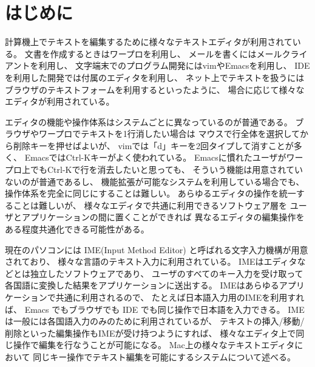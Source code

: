 \section{はじめに}

計算機上でテキストを編集するために様々なテキストエディタが利用されている。
文書を作成するときはワープロを利用し、
メールを書くにはメールクライアントを利用し、
文字端末でのプログラム開発にはvimやEmacsを利用し、
IDEを利用した開発では付属のエディタを利用し、
ネット上でテキストを扱うにはブラウザのテキストフォームを利用するといったように、
場合に応じて様々なエディタが利用されている。

エディタの機能や操作体系はシステムごとに異なっているのが普通である。
ブラウザやワープロでテキストを1行消したい場合は
マウスで行全体を選択してから削除キーを押せばよいが、
vimでは「d」キーを2回タイプして消すことが多く、
EmacsではCtrl-Kキーがよく使われている。
Emacsに慣れたユーザがワープロ上でもCtrl-Kで行を消去したいと思っても、
そういう機能は用意されていないのが普通であるし、
機能拡張が可能なシステムを利用している場合でも、
操作体系を完全に同じにすることは難しい。
%
あらゆるエディタの操作を統一することは難しいが、
様々なエディタで共通に利用できるソフトウェア層を
ユーザとアプリケーションの間に置くことができれば
異なるエディタの編集操作をある程度共通化できる可能性がある。

現在のパソコンには IME(Input Method Editor) と呼ばれる文字入力機構が用意されており、
様々な言語のテキスト入力に利用されている。
IMEはエディタなどとは独立したソフトウェアであり、
ユーザのすべてのキー入力を受け取って
各国語に変換した結果をアプリケーションに送出する。
IMEはあらゆるアプリケーションで共通に利用されるので、
たとえば日本語入力用のIMEを利用すれば、
Emacs でもブラウザでも IDE でも同じ操作で日本語を入力できる。
IMEは一般には各国語入力のみのために利用されているが、
テキストの挿入/移動/削除といった編集操作もIMEが受け持つようにすれば、
様々なエディタ上で同じ操作で編集を行なうことが可能になる。
%
Mac上の様々なテキストエディタにおいて
同じキー操作でテキスト編集を可能にする{\system}システムについて述べる。

